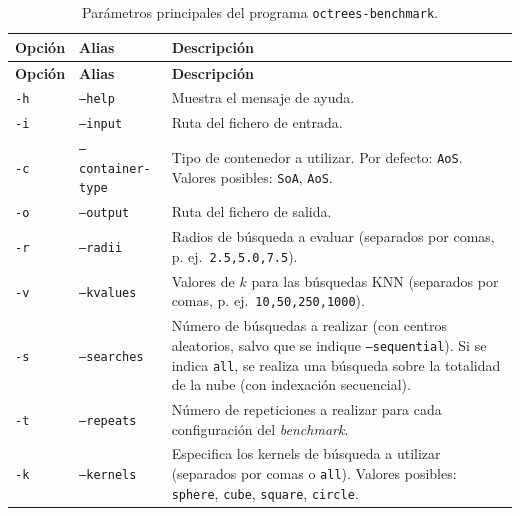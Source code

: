 \renewcommand{\arraystretch}{1.3}
\begin{longtable}{p{1.6cm} p{3.3cm} p{8.8cm}}
\caption{Parámetros principales del programa \texttt{octrees-benchmark}.} \\
\toprule
\textbf{Opción} & \textbf{Alias} & \textbf{Descripción} \\
\midrule
\endfirsthead
\toprule
\textbf{Opción} & \textbf{Alias} & \textbf{Descripción} \\
\midrule
\endhead
\bottomrule
\endfoot

\texttt{-h} & \texttt{--help} & Muestra el mensaje de ayuda. \\

\texttt{-i} & \texttt{--input} & Ruta del fichero de entrada. \\

\texttt{-c} & \texttt{--container-type} &
Tipo de contenedor a utilizar. Por defecto: \texttt{AoS}. Valores posibles:
\texttt{SoA}, \texttt{AoS}. \\

\texttt{-o} & \texttt{--output} & Ruta del fichero de salida. \\

\texttt{-r} & \texttt{--radii} &
Radios de búsqueda a evaluar (separados por comas, p. ej.\
\texttt{2.5,5.0,7.5}). \\

\texttt{-v} & \texttt{--kvalues} &
Valores de $k$ para las búsquedas KNN (separados por comas, p. ej.\
\texttt{10,50,250,1000}). \\

\texttt{-s} & \texttt{--searches} &
Número de búsquedas a realizar (con centros aleatorios, salvo que se
indique \texttt{--sequential}). Si se indica \texttt{all}, se realiza una
búsqueda sobre la totalidad de la nube (con indexación secuencial). \\

\texttt{-t} & \texttt{--repeats} &
Número de repeticiones a realizar para cada configuración del
\textit{benchmark}. \\

\texttt{-k} & \texttt{--kernels} &
Especifica los kernels de búsqueda a utilizar (separados por comas o
\texttt{all}). Valores posibles: \texttt{sphere}, \texttt{cube},
\texttt{square}, \texttt{circle}. \\


\end{longtable}
